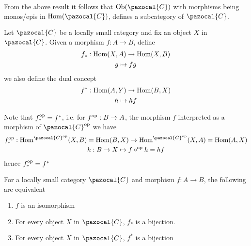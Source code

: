 \begin{remark}
    From the above result it follows that $\Ob(\pazocal{C})$ with morphisms being monos/epis in $\Hom(\pazocal{C})$, defines a subcategory of $\pazocal{C}$.
\end{remark}
\begin{definition}
    Let $\pazocal{C}$ be a locally small category and fix an object $X$ in $\pazocal{C}$. Given a morphism $f:A\rightarrow B$, define 
    \begin{gather*}
        f_\ast : \mathrm{Hom}(X,A) \rightarrow \mathrm{Hom}(X,B)\\
        g\mapsto fg
    \end{gather*}  
    we also define the dual concept 
    \begin{gather*}
        f^\ast : \mathrm{Hom}(A,Y) \rightarrow \mathrm{Hom}(B,X)\\
        h\mapsto hf
    \end{gather*}
\end{definition}
\begin{remark}
    Note that $f^\mathrm{op}_\ast = f^\ast$, i.e. for $f^\mathrm{op} : B \rightarrow A$, the morphism $f$ interpreted as a morphism of $\pazocal{C}\op$ we have 
    \begin{gather*}
        f\op_\ast : \Hom^{\pazocal{C}\op}(X,B)=\Hom(B,X) \rightarrow \Hom^{\pazocal{C}\op}(X,A)=\Hom(A,X)\\
        h: B\rightarrow X \mapsto f\circ\op h= hf
    \end{gather*}
    hence $f^\mathrm{op}_\ast = f^\ast$
\end{remark}
\begin{lemma}
    For a locally small category $\pazocal{C}$ and morphism $f:A\rightarrow B$, the following are equivalent
    \begin{enumerate}
        \item $f$ is an isomorphism
        \item For every object $X$ in $\pazocal{C}$, $f_\ast$ is a bijection. 
        \item For every object $X$ in $\pazocal{C}$, $f^\ast$ is a bijection
    \end{enumerate}
\end{lemma}
